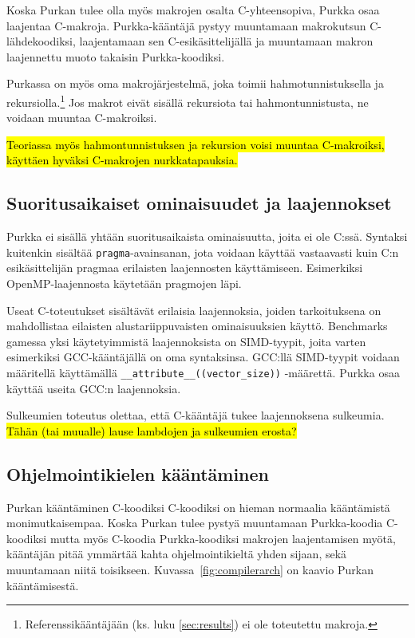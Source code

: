 Koska Purkan tulee olla myös makrojen osalta C-yhteensopiva, Purkka osaa
laajentaa C-makroja. Purkka-kääntäjä pystyy muuntamaan makrokutsun
C-lähdekoodiksi, laajentamaan sen C-esikäsittelijällä ja muuntamaan makron
laajennettu muoto takaisin Purkka-koodiksi.

Purkassa on myös oma makrojärjestelmä, joka toimii hahmotunnistuksella ja
rekursiolla.\footnote{Referenssikääntäjään (ks. luku \ref{sec:results}) ei ole
toteutettu makroja.} Jos makrot eivät sisällä rekursiota tai hahmontunnistusta,
ne voidaan muuntaa C-makroiksi.

\hl{Teoriassa myös hahmontunnistuksen ja rekursion voisi muuntaa C-makroiksi,
käyttäen hyväksi C-makrojen nurkkatapauksia.}

\subsection{Suoritusaikaiset ominaisuudet ja laajennokset}

Purkka ei sisällä yhtään suoritusaikaista ominaisuutta, joita ei ole C:ssä.
Syntaksi kuitenkin sisältää \texttt{pragma}-avainsanan, jota voidaan käyttää
vastaavasti kuin C:n esikäsittelijän pragmaa erilaisten laajennosten
käyttämiseen. Esimerkiksi OpenMP-laajennosta käytetään pragmojen läpi.

Useat C-toteutukset sisältävät erilaisia laajennoksia, joiden tarkoituksena on
mahdollistaa eilaisten alustariippuvaisten ominaisuuksien käyttö. Benchmarks
gamessa yksi käytetyimmistä laajennoksista on SIMD-tyypit, joita varten
esimerkiksi GCC-kääntäjällä on oma syntaksinsa. GCC:llä SIMD-tyypit voidaan
määritellä käyttämällä \texttt{\_\_attribute\_\_((vector\_size))} -määrettä.
Purkka osaa käyttää useita GCC:n laajennoksia.

Sulkeumien toteutus olettaa, että C-kääntäjä tukee laajennoksena sulkeumia.
\hl{Tähän (tai muualle) lause lambdojen ja sulkeumien erosta?}

\subsection{Ohjelmointikielen kääntäminen}

Purkan kääntäminen C-koodiksi C-koodiksi on hieman normaalia kääntämistä
monimutkaisempaa. Koska Purkan tulee pystyä muuntamaan Purkka-koodia C-koodiksi
mutta myös C-koodia Purkka-koodiksi makrojen laajentamisen myötä, kääntäjän
pitää ymmärtää kahta ohjelmointikieltä yhden sijaan, sekä muuntamaan niitä
toisikseen. Kuvassa~\ref{fig:compilerarch} on kaavio Purkan kääntämisestä.


